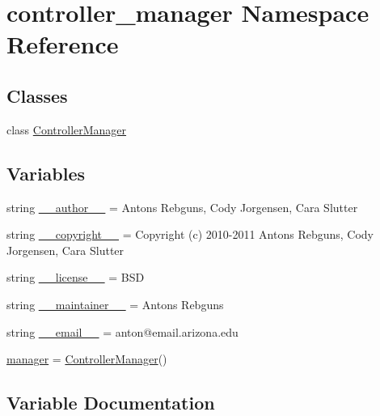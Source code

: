 \hypertarget{namespacecontroller__manager}{}\section{controller\+\_\+manager Namespace Reference}
\label{namespacecontroller__manager}
\subsection*{Classes}
\begin{DoxyCompactItemize}
\item 
class \hyperlink{classcontroller__manager_1_1_controller_manager}{Controller\+Manager}
\end{DoxyCompactItemize}
\subsection*{Variables}
\begin{DoxyCompactItemize}
\item 
string \hyperlink{namespacecontroller__manager_a90d715166bd18d5b8bb14fa2ee15653c}{\+\_\+\+\_\+author\+\_\+\+\_\+} = \textquotesingle{}Antons Rebguns, Cody Jorgensen, Cara Slutter\textquotesingle{}
\item 
string \hyperlink{namespacecontroller__manager_a6cf02b8fd6792f2e424072116dd8675e}{\+\_\+\+\_\+copyright\+\_\+\+\_\+} = \textquotesingle{}Copyright (c) 2010-\/2011 Antons Rebguns, Cody Jorgensen, Cara Slutter\textquotesingle{}
\item 
string \hyperlink{namespacecontroller__manager_a2c9b9c872c09558b7545bfdb969042f9}{\+\_\+\+\_\+license\+\_\+\+\_\+} = \textquotesingle{}B\+SD\textquotesingle{}
\item 
string \hyperlink{namespacecontroller__manager_a354d8321d95f903b21cf55e575ff6c0d}{\+\_\+\+\_\+maintainer\+\_\+\+\_\+} = \textquotesingle{}Antons Rebguns\textquotesingle{}
\item 
string \hyperlink{namespacecontroller__manager_a127055555ac1277166f13e7c80b9eecd}{\+\_\+\+\_\+email\+\_\+\+\_\+} = \textquotesingle{}anton@email.\+arizona.\+edu\textquotesingle{}
\item 
\hyperlink{namespacecontroller__manager_a4dcbb92926a87e07f1344a43917a3391}{manager} = \hyperlink{classcontroller__manager_1_1_controller_manager}{Controller\+Manager}()
\end{DoxyCompactItemize}


\subsection{Variable Documentation}
\mbox{\label{namespacecontroller__manager_a90d715166bd18d5b8bb14fa2ee15653c}} 
